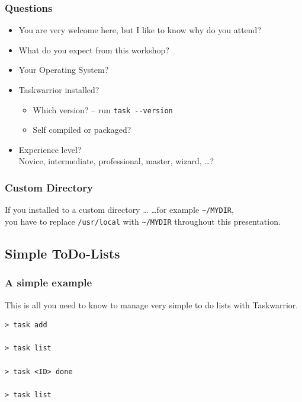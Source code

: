 \documentclass[t,handout,aspectratio=169]{beamer}
\begin{document}
\begin{frame}[fragile]\frametitle{Questions}
    \vfill
    \begin{itemize}
        \item You are very welcome here, but I like to know why do you attend? \pause
        \item What do you expect from this workshop? \pause
        \item Your Operating System? \pause
        \item Taskwarrior installed? \pause
        \begin{itemize}
            \item Which version? -- run \verb+task --version+ \pause
            \item Self compiled or packaged? \pause
        \end{itemize}
        \item Experience level? \\
            Novice, intermediate, professional, master, wizard, \ldots?
    \end{itemize}
\end{frame}

\begin{frame}[fragile]\frametitle{Custom Directory}
    \vfill
    \begin{alertblock}{If you installed to a custom directory \ldots}
        \ldots for example \verb+~/MYDIR+, \\
        you have to replace \verb+/usr/local+ with \verb+~/MYDIR+ throughout this presentation.
    \end{alertblock}
\end{frame}

\subsection{Simple ToDo-Lists}

\begin{frame}[fragile]\frametitle{A simple example}
    \vfill
    This is all you need to know to manage very simple to do lists with Taskwarrior. \pause
    \begin{lstlisting}
> task add

> task list

> task <ID> done

> task list\end{lstlisting}
\end{frame}
\end{document}
